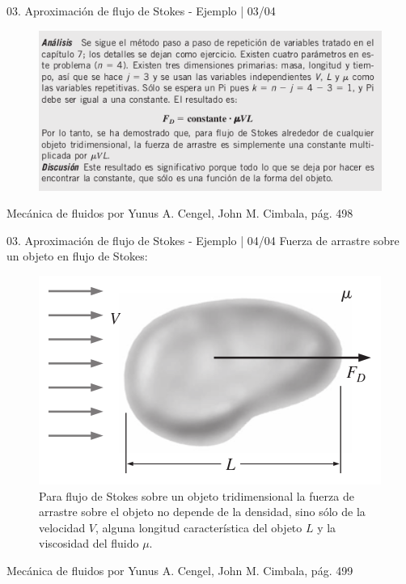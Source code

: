 \begin{frame}{03. Aproximación de flujo de Stokes - Ejemplo | 03/04}
\justifying
\begin{figure}[H]
\centering
\includegraphics[scale=0.55]{Section_Files/S3-imagenes-Jhon/0027-02.png}
\end{figure}
{\tiny Mecánica de fluidos por Yunus A. Cengel, John M. Cimbala, pág. 498}
\end{frame}

\begin{frame}{03. Aproximación de flujo de Stokes - Ejemplo |  04/04}
\justifying
Fuerza de arrastre sobre un objeto en flujo de Stokes:
\begin{figure}[H]
\centering
\includegraphics[scale=0.35]{Section_Files/S3-imagenes-Jhon/0031.png}
\caption{Para flujo de Stokes sobre un objeto tridimensional la fuerza de arrastre sobre el objeto no depende de la densidad, sino sólo de la velocidad $ V $, alguna longitud característica del objeto $ L $ y la viscosidad del fluido $ \mu $.}
\end{figure}
{\tiny Mecánica de fluidos por Yunus A. Cengel, John M. Cimbala, pág. 499}
\end{frame}

